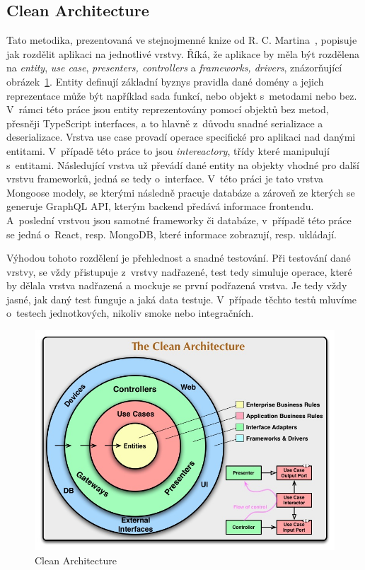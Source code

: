 \subsection{Clean Architecture}
\label{ss:clean_architecture}
Tato metodika, prezentovaná ve stejnojmenné knize od R. C. Martina~\cite{martin_2018_clean}, popisuje jak rozdělit aplikaci na jednotlivé vrstvy. Říká, že aplikace by měla být rozdělena na \emph{entity}, \emph{use case}, \emph{presenters, controllers} a \emph{frameworks, drivers}, znázorňující obrázek~\ref{fig:clean_architecture}.
Entity definují základní byznys pravidla dané domény a jejich reprezentace může být například sada funkcí, nebo objekt s~metodami nebo bez. V~rámci této práce jsou entity reprezentovány pomocí objektů bez metod, přesněji TypeScript interfaces, a to hlavně z~důvodu snadné serializace a deserializace.
Vrstva use case provadí operace specifické pro aplikaci nad danými entitami. V~případě této práce to jsou \emph{intereactory}, třídy které manipulují s~entitami.
Následující vrstva už převádí dané entity na objekty vhodné pro další vrstvu frameworků, jedná se tedy o~interface. V~této práci je tato vrstva Mongoose modely, se kterými následně pracuje databáze a zároveň ze kterých se generuje GraphQL API, kterým backend předává informace frontendu. A~poslední vrstvou jsou samotné frameworky či databáze, v~případě této práce se jedná o~React, resp. MongoDB, které informace zobrazují, resp. ukládají.

Výhodou tohoto rozdělení je přehlednost a snadné testování. Při testování dané vrstvy, se vždy přistupuje z~vrstvy nadřazené, test tedy simuluje operace, které by dělala vrstva nadřazená a mockuje se první podřazená vrstva. Je tedy vždy jasné, jak daný test funguje a jaká data testuje. V~případe těchto testů mluvíme o~testech jednotkových, nikoliv smoke nebo integračních.

\begin{figure}
    \centering
    \includegraphics[width=\textwidth]{assets/clean_architecture.jpg}
    \caption{Clean Architecture \cite{martin_2019_clean}}
    \label{fig:clean_architecture}
\end{figure}
